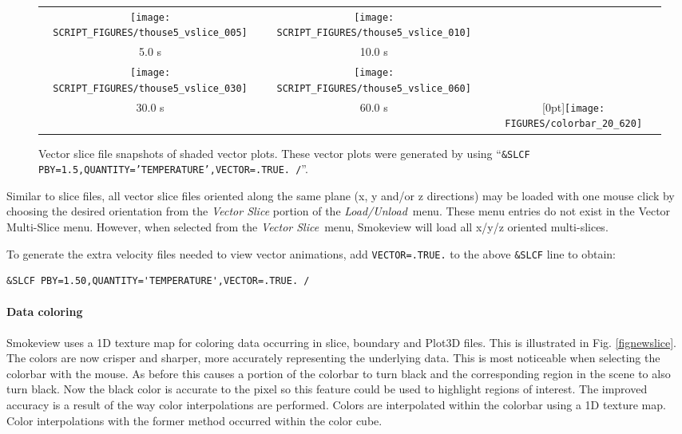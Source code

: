 \documentclass[11pt,twoside]{book}
\begin{document}
\begin{figure}[\figoptions]
\begin{center}
\begin{tabular}{ccc}
\texttt{[image: SCRIPT\_FIGURES/thouse5\_vslice\_005]}&
\texttt{[image: SCRIPT\_FIGURES/thouse5\_vslice\_010]}\\
5.0 s&10.0 s\\
\texttt{[image: SCRIPT\_FIGURES/thouse5\_vslice\_030]}&
\texttt{[image: SCRIPT\_FIGURES/thouse5\_vslice\_060]}\\
30.0 s&60.0 s
&\raisebox{0.0ex}[0pt]{\texttt{[image: FIGURES/colorbar\_20\_620]}}\\
\end{tabular}
\end{center}
\caption [Vector slice file snapshots of shaded vector plots.]
{Vector slice file snapshots of shaded vector plots. These vector
plots were generated by using ``{\tt \&SLCF
PBY=1.5,QUANTITY='TEMPERATURE',VECTOR=.TRUE. /}''.}
\label{figvslice}%
\end{figure}

Similar to slice files, all vector slice files oriented along the same plane (x, y and/or z directions) may be loaded
with one mouse click by choosing the desired orientation from the {\em Vector Slice}
portion of the {\em Load/Unload}\ menu.  These menu entries do not exist in the Vector Multi-Slice menu.
However, when selected from the {\em Vector Slice}\ menu, Smokeview will load all x/y/z oriented multi-slices.

To generate the extra velocity files needed to view vector
animations, add {\tt VECTOR=.TRUE.} to the above {\tt \&SLCF} line
to obtain:
\begin{lstlisting}
&SLCF PBY=1.50,QUANTITY='TEMPERATURE',VECTOR=.TRUE. /
\end{lstlisting}

\paragraph{Data coloring}Smokeview uses a 1D texture map for coloring data occurring in
slice, boundary and Plot3D files. This is illustrated in Fig.
\ref{fignewslice}.  The colors are now crisper and sharper, more
accurately representing the underlying data. This is most
noticeable when selecting the colorbar with the mouse. As before
this causes a portion of the colorbar to turn black and the
corresponding region in the scene to also turn black.  Now the
black color is accurate to the pixel so this feature could be used
to highlight regions of interest. The improved accuracy is a
result of the way color interpolations are performed.  Colors
are interpolated within the colorbar using a 1D texture map.  Color interpolations with
the former method occurred within the color cube.
\end{document}
